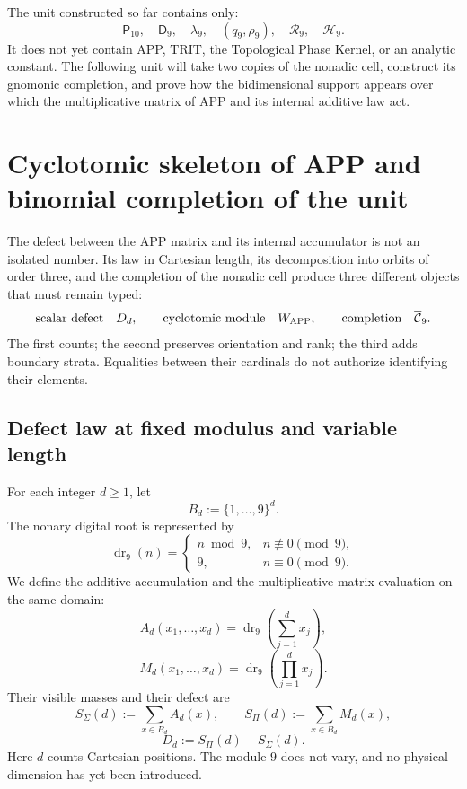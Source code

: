 The unit constructed so far contains only:
\[
 \mathsf P_{10},\quad
 \mathsf D_9,\quad
 \lambda_9,\quad
 (q_9,\rho_9),\quad
 \mathcal R_9,\quad
 \mathcal H_9.
\]
It does not yet contain APP, TRIT, the Topological Phase Kernel, or an analytic
constant. The following unit will take two copies of the nonadic cell,
construct its gnomonic completion, and prove how the bidimensional support appears
over which the multiplicative matrix of APP and its internal additive law act.



\section{Cyclotomic skeleton of APP and binomial completion of the unit}
\label{p12-83-c1-s5:chap:app-esqueleto-completacion}

The defect between the APP matrix and its internal accumulator is not an isolated
number. Its law in
Cartesian length, its decomposition into orbits of order three, and the
completion of the nonadic cell produce three different objects that must
remain typed:
\[
 \text{scalar defect}\quad D_d,
 \qquad
 \text{cyclotomic module}\quad W_{\rm APP},
 \qquad
 \text{completion}\quad\overline{\mathcal C}_9.
\]
The first counts; the second preserves orientation and rank; the third adds
boundary strata. Equalities between their cardinals do not authorize identifying
their elements.

\subsection{Defect law at fixed modulus and variable length}

For each integer \(d\geq1\), let
\[
 B_d:=\{1,\ldots,9\}^d.
\]
The nonary digital root is represented by
\[
 \operatorname{dr}_9(n)=
 \begin{cases}
 n\bmod9,&n\not\equiv0\pmod9,\\
 9,&n\equiv0\pmod9.
 \end{cases}
\]
We define the additive accumulation and the multiplicative matrix evaluation on the same domain:
\[
 A_d(x_1,\ldots,x_d)
 =\operatorname{dr}_9\!\left(\sum_{j=1}^d x_j\right),
\]
\[
 M_d(x_1,\ldots,x_d)
 =\operatorname{dr}_9\!\left(\prod_{j=1}^d x_j\right).
\]
Their visible masses and their defect are
\[
 S_\Sigma(d):=\sum_{x\in B_d}A_d(x),
 \qquad
 S_\Pi(d):=\sum_{x\in B_d}M_d(x),
\]
\[
 D_d:=S_\Pi(d)-S_\Sigma(d).
\]
Here \(d\) counts Cartesian positions. The module \(9\) does not vary, and no
physical dimension has yet been introduced.

